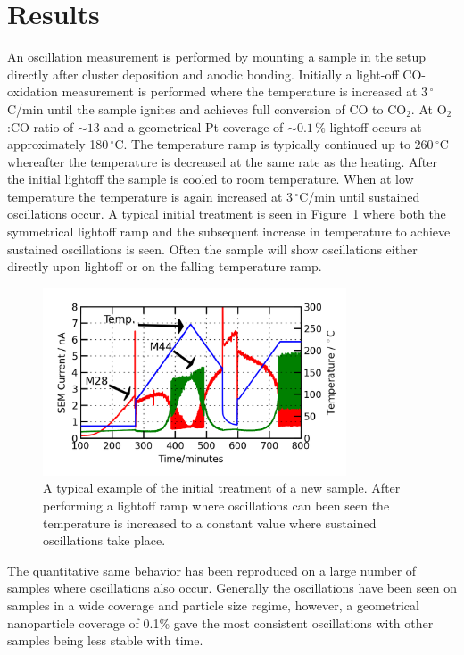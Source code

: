 \documentclass[8.5pt,twoside,twocolumn]{article}
\begin{document}
\section{Results}
An oscillation measurement is performed by mounting a sample in the setup directly after cluster deposition and anodic bonding. Initially a light-off CO-oxidation measurement is performed where the temperature is increased at 3\,$^\circ$C/min until the sample ignites and achieves full conversion of CO to CO$_2$. At O$_2$:CO ratio of $\sim13$ and a geometrical Pt-coverage of $\sim0.1\,\%$ lightoff occurs at approximately 180\,$^\circ$C. The temperature ramp is typically continued up to 260\,$^\circ$C whereafter the temperature is decreased at the same rate as the heating. After the initial lightoff the sample is cooled to room temperature. When at low temperature the temperature is again increased at 3\,$^\circ$C/min until sustained oscillations occur. A typical initial treatment is seen in Figure~\ref{fgr:initial_treatment} where both the symmetrical lightoff ramp and the subsequent increase in temperature to achieve sustained oscillations is seen. Often the sample will show oscillations either directly upon lightoff or on the falling temperature ramp.
\begin{figure}[h]
\centering
  \includegraphics[width=9cm]{initial_treatment.png}
  \caption{A typical example of the initial treatment of a new sample. After performing a lightoff ramp where oscillations can been seen the temperature is increased to a constant value where sustained oscillations take place.}
  \label{fgr:initial_treatment}
\end{figure}
The quantitative same behavior has been reproduced on a large number of samples where oscillations also occur. Generally the oscillations have been seen on samples in a wide coverage and particle size regime, however, a geometrical nanoparticle coverage of 0.1\% gave the most consistent oscillations with other samples being less stable with time.
\end{document}
